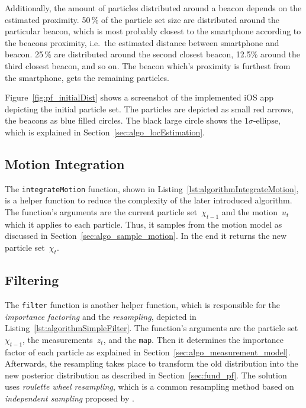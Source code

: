 Additionally, the amount of particles distributed around a beacon depends on the estimated proximity. 50\,\% of the particle set size are distributed around the particular beacon, which is most probably closest to the smartphone according to the beacons proximity, i.e.\ the estimated distance between smartphone and beacon. 25\,\% are distributed around the second closest beacon, 12.5\% around the third closest beacon, and so on. The beacon which's proximity is furthest from the smartphone, gets the remaining particles.

Figure~\ref{fig:pf_initialDist} shows a screenshot of the implemented iOS app depicting the initial particle set. The particles are depicted as small red arrows, the beacons as blue filled circles. The black large circle shows the $1\sigma\text{-ellipse}$, which is explained in Section~\ref{sec:algo_locEstimation}.


\subsection{Motion Integration}
The \texttt{integrateMotion} function, shown in Listing~\ref{lst:algorithmIntegrateMotion}, is a helper function to reduce the complexity of the later introduced algorithm. The function's arguments are the current particle set~$\chi_{t-1}$ and the motion~$u_t$ which it applies to each particle. Thus, it samples from the motion model as discussed in Section~\ref{sec:algo_sample_motion}. In the end it returns the new particle set~$\chi_t$.




\subsection{Filtering}
The \texttt{filter} function is another helper function, which is responsible for the \emph{importance factoring} and the \emph{resampling}, depicted in Listing~\ref{lst:algorithmSimpleFilter}. The function's arguments are the particle set~$\chi_{t-1}$, the measurements~$z_t$, and the \texttt{map}. Then it determines the importance factor of each particle as explained in Section~\ref{sec:algo_measurement_model}. Afterwards, the resampling takes place to transform the old distribution into the new posterior distribution as described in Section~\ref{sec:fund_pf}. The solution uses \emph{roulette wheel resampling}, which is a common resampling method based on \emph{independent sampling} proposed by \citet[p. 108--111]{thrun:prob_robo}.

